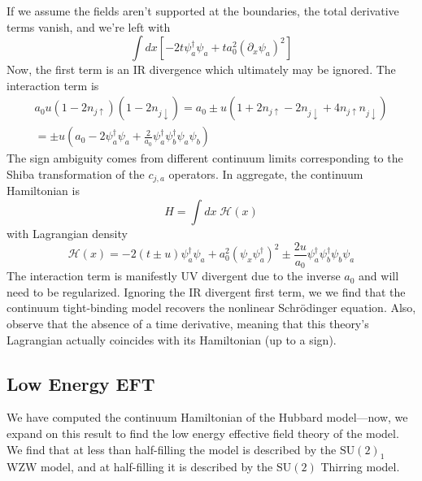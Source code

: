 \documentclass{report}
\begin{document}
If we assume the fields aren't supported at the boundaries, the total derivative 
terms vanish, and we're left with 
\begin{equation*}
	\int dx \left[
		-2t \psi_a^\dagger \psi_a + ta_0^2 (\partial_x \psi_a)^2
	\right]
\end{equation*} 
Now, the first term is an IR divergence which ultimately may be ignored.  The
interaction term is 
\begin{align*}
	a_0u(1-2n_{j\uparrow})(1-2n_{j\downarrow})
		= a_0\pm u(1+2n_{j\uparrow} - 2n_{j\downarrow} + 4n_{j\uparrow} n_{j\downarrow})\\
		= \pm u \left(a_0 - 2 \psi_a^\dagger \psi_a 
			+ \frac{2}{a_0} \psi_a^\dagger \psi_b^\dagger \psi_a \psi_b \right)
\end{align*}
The sign ambiguity comes from different continuum limits corresponding to the 
Shiba transformation of the $ c_{j,a} $ operators. In aggregate, the 
continuum Hamiltonian is 
\begin{equation*}
	H = \int dx\; \mathcal{H}(x)
\end{equation*}
with Lagrangian density 
\begin{equation*}
	\mathcal{H} (x)
		= -2 (t \pm u ) \psi_a^\dagger \psi_a 
			+ a_0^2 (\psi_x\psi_a^\dagger)^2 \pm \frac{2u}{a_0}
				\psi_a^\dagger \psi_b^\dagger \psi_b \psi_a
\end{equation*}
The interaction term is manifestly UV divergent due to the inverse $ a_0 $ 
and will need to be regularized. Ignoring the IR divergent first term, we 
we find that the continuum tight-binding model recovers the nonlinear 
Schr\"odinger equation. Also, observe that the absence of a time derivative, 
meaning that this theory's Lagrangian actually coincides with its Hamiltonian
(up to a sign).

\subsection{Low Energy EFT}
We have computed the continuum Hamiltonian of the Hubbard model---now, we expand 
on this result to find the low energy effective field theory of the model. 
We find that at less than half-filling the model is described by the 
$ \text{SU}(2)_1 $ WZW model, and at half-filling it is described by the 
$ \text{SU}(2) $ Thirring model. 


\end{document}
